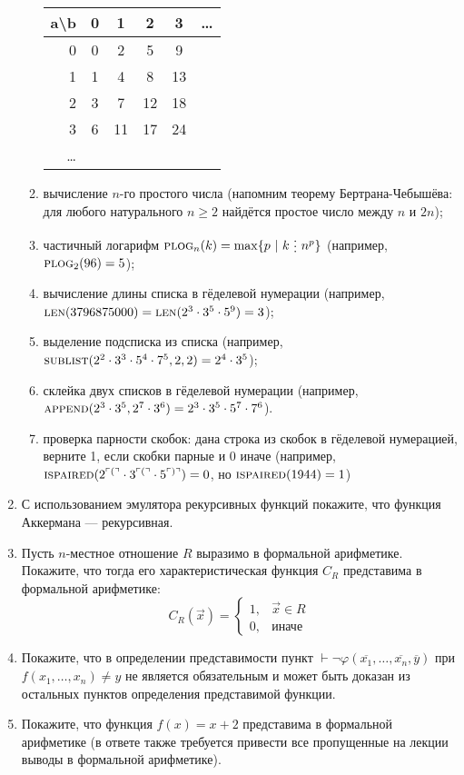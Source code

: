 \documentclass[10pt,a4paper,oneside]{article}
\begin{document}
\begin{enumerate}
\begin{enumerate}
\begin{center}\begin{tabular}{r|ccccc}
a\textbackslash{}b & 0 & 1 & 2 & 3 & \dots\\\hline
  0                & 0 & 2 & 5 & 9 \\
  1                & 1 & 4 & 8 & 13  \\
  2                & 3 & 7 & 12 & 18   \\
  3                & 6 & 11 & 17 & 24\\
  \dots
\end{tabular}\end{center}
\item вычисление $n$-го простого числа (напомним теорему Бертрана-Чебышёва: для любого натурального $n \ge 2$ найдётся
простое число между $n$ и $2n$);
\item частичный логарифм $\textsc{plog}_n(k) = \max\{p\ |\ k\ \raisebox{-0.5ex}{\vdots}\ n^p\}$ (например, $\textsc{plog}_2(96)=5$);
\item вычисление длины списка в гёделевой нумерации (например, $\textsc{len}(3796875000) = \textsc{len}(2^3\cdot 3^5\cdot 5^9) = 3$);
\item выделение подсписка из списка (например, $\textsc{sublist}(2^2 \cdot 3^3 \cdot 5^4 \cdot 7^5, 2, 2) = 2^4 \cdot 3^5$);
\item склейка двух списков в гёделевой нумерации (например, $\textsc{append}(2^3 \cdot 3^5,2^7 \cdot 3^6) = 2^3 \cdot 3^5 \cdot 5^7 \cdot 7^6$).
\item проверка парности скобок: дана строка из скобок в гёделевой нумерацией, верните 1, если скобки парные и 0 иначе (например, 
$\textsc{ispaired}(2^{\ulcorner ( \urcorner} \cdot 3^{\ulcorner ( \urcorner} \cdot 5^{\ulcorner ) \urcorner}) = 0$,
но $\textsc{ispaired}(1944) = 1$)
\end{enumerate}

\item С использованием эмулятора рекурсивных функций покажите, что функция Аккермана --- рекурсивная.

\item Пусть $n$-местное отношение $R$ выразимо в формальной арифметике. Покажите, что
тогда его характеристическая функция $C_R$ представима в формальной арифметике:
$$C_R(\overrightarrow{x}) = \left\{\begin{array}{ll}1,& \overrightarrow{x}\in R\\0, &\text{иначе}\end{array}\right.$$

\item Покажите, что в определении представимости пункт
$\vdash\neg\varphi(\overline{x_1},\dots,\overline{x_n},\overline{y})$ при $f(x_1,\dots,x_n) \ne y$ не является
обязательным и может быть доказан из остальных пунктов определения представимой функции.

\item Покажите, что функция $f(x) = x+2$ представима в формальной арифметике (в ответе также требуется привести все пропущенные
на лекции выводы в формальной арифметике).
\end{enumerate}
\end{document}
